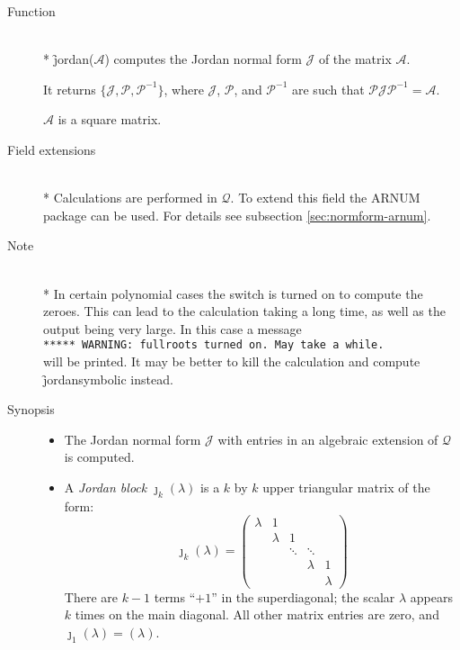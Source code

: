 \begin{description}
\item[Function]\mbox{}\\*
%
\f{jordan}($\mathcal{A}$) computes the Jordan normal form
$\mathcal{J}$ of the matrix $\mathcal{A}$.

It returns $\{\mathcal{J}, \mathcal{P}, \mathcal{P}^{-1}\}$, where
$\mathcal{J}$, $\mathcal{P}$, and $\mathcal{P}^{-1}$ are such that $\mathcal{P J P}^
{-1} = \mathcal{A}$.

$\mathcal{A}$ is a square matrix.

\item[Field extensions]\mbox{}\\*
%
Calculations are performed in $\mathcal{Q}$. To extend this field the
{\small ARNUM} package can be used. For details see subsection \ref{sec:normform-arnum}.

\item[Note]\mbox{}\\*
In certain polynomial cases the switch  is turned on to compute the
zeroes. This can lead to the calculation taking a long time, as well as
the output being very large. In this case a message \\
\verb|***** WARNING: fullroots turned on. May take a while.|\\
will be printed. It may be
better to kill the calculation and compute \f{jordansymbolic} instead.

\item[Synopsis]

\begin{itemize}
\item The Jordan normal form $\mathcal{J}$ with entries in an algebraic
      extension of $\mathcal{Q}$ is computed.

\item A \emph{Jordan block} ${\jmath}_{k}(\lambda)$ is a $k$ by $k$
      upper triangular matrix of the form:
%
      \[
      {\jmath}_{k}(\lambda) = \begin{pmatrix} \lambda & 1
      &  &  & \\  &  \lambda & 1  & & \\ &
      & \ddots & \ddots & \\ &  &  &  \lambda & 1 \\ &
      &  &  & \lambda \end{pmatrix}
      \]
%
      There are $k-1$ terms ``$+1$'' in the superdiagonal; the scalar
      $\lambda$ appears $k$ times on the main diagonal. All other
      matrix entries are zero, and ${\jmath}_{1}(\lambda) = (\lambda)$.


\end{itemize}
\end{description}
